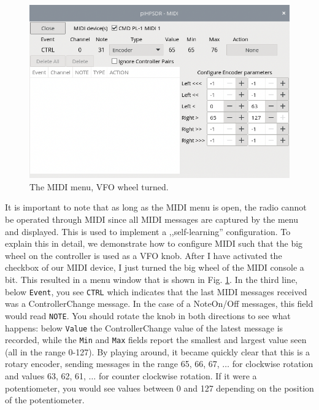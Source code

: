 \documentclass[12pt]{book}
\def\rett#1{\texttt{\color{red}#1}}
\begin{document}
\begin{figure}[ht]
\center
\includegraphics[scale=0.45]{MIDImenu2.png}
\caption{The MIDI menu, VFO wheel turned.}
\label{fig:MIDImenu2}
\end{figure}

It is important to note that as long as the MIDI menu is open, the radio cannot be
operated through MIDI since all MIDI messages are captured by the menu and
displayed. This is used to implement a ,,self-learning'' configuration. To explain
this in detail, we demonstrate how to configure MIDI such that the big wheel on the
controller is used as a VFO knob. After I have activated the checkbox of our
MIDI device, I just turned the big wheel of the MIDI console a bit. This resulted
in a menu window that is shown in Fig. \ref{fig:MIDImenu2}. In the third line,
below \rett{Event}, you see \texttt{CTRL} which indicates that the last MIDI messages
received was a ControllerChange message. In the case of a NoteOn/Off messages, this
field would read \texttt{NOTE}. You should rotate the knob in both directions to
see what happens: below \rett{Value} the ControllerChange value of the latest
message is recorded, while the \rett{Min} and \rett{Max} fields report the smallest
and largest value seen (all in the range 0-127). By playing around, it became
quickly clear that this is a rotary encoder, sending messages in the range 65, 66, 67,
$\ldots$ for clockwise rotation and values 63, 62, 61, $\ldots$ for counter clockwise
rotation. If it were a potentiometer, you would see values between 0 and 127
depending on the position of the potentiometer.
\end{document}
